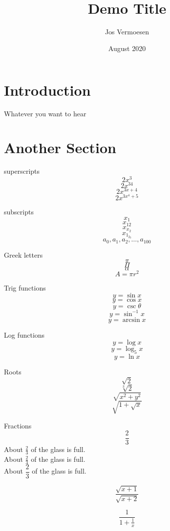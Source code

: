 \documentclass[11pt]{article}
\title{Demo Title}
\author{Jos Vermoesen }
\date{August 2020}
\begin{document}
\maketitle

\section{Introduction}
Whatever you want to hear

\section{Another Section}
superscripts \[2x^3\]
\[2x^{34}\]
\[2x^{3x+4}\]
\[2x^{3x^4+5}\]

subscripts
\[x_1\]
\[x_{12}\]
\[x_{x_2}\]
\[x_{1_{2_3}}\]
\[a_0, a_1, a_2, \ldots, a_{100}\]

Greek letters
\[\pi\]
\[\Pi\]
\[\alpha\]
\[A=\pi r^2\]

Trig functions
\[y=\sin x\]
\[y=\cos x\]
\[y=\csc \theta\]
\[y=\sin^{-1} x\]
\[y=\arcsin x\]

Log functions
\[y=\log x\]
\[y=\log_5 x\]
\[y=\ln x\]

Roots
\[\sqrt{2}\]
\[\sqrt[3]{2}\]
\[\sqrt{x^2+y^2}\]
\[\sqrt{1+\sqrt{x}}\]

Fractions
\[\frac{2}{3}\]
About $\displaystyle \frac{2}{3}$ of the glass is full.\\[16pt]
About $\frac{2}{3}$ of the glass is full.\\[6pt]
About $\dfrac{2}{3}$ of the glass is full.

\[\frac{\sqrt{x+1}}{\sqrt{x+2}}\]

\[\frac{1}{1+\frac{1}{x}}\]
\end{document}
